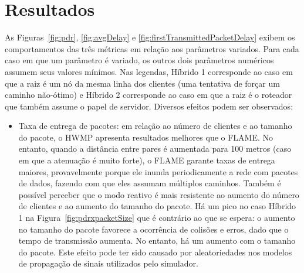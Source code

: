 \documentclass[letterpaper, 10 pt, conference]{ieeeconf}  %
\begin{document}
\section{Resultados}
\label{sec:results}

As Figuras~\ref{fig:pdr}, \ref{fig:avgDelay} e \ref{fig:firstTransmittedPacketDelay} exibem os comportamentos das três métricas em relação aos parâmetros variados. Para cada caso em que um parâmetro é variado, os outros dois parâmetros numéricos assumem seus valores mínimos. Nas legendas, Híbrido 1 corresponde ao caso em que a raiz é um nó da mesma linha dos clientes (uma tentativa de forçar um caminho não-ótimo) e Híbrido 2 corresponde ao caso em que a raiz é o roteador que também assume o papel de servidor. Diversos efeitos podem ser observados:

\begin{itemize}
	\item Taxa de entrega de pacotes: em relação ao número de clientes e ao tamanho do pacote, o HWMP apresenta resultados melhores que o FLAME. No entanto, quando a distância entre pares é aumentada para 100 metros (caso em que a atenuação é muito forte), o FLAME garante taxas de entrega maiores, provavelmente porque ele inunda periodicamente a rede com pacotes de dados, fazendo com que eles assumam múltiplos caminhos. Também é possível perceber que o modo reativo é mais resistente ao aumento do número de clientes e ao aumento do tamanho do pacote. Há um pico no caso Híbrido 1 na Figura~\ref{fig:pdrxpacketSize} que é contrário ao que se espera: o aumento no tamanho do pacote favorece a ocorrência de colisões e erros, dado que o tempo de transmissão aumenta. No entanto, há um aumento com o tamanho do pacote. Este efeito pode ter sido causado por aleatoriedades nos modelos de propagação de sinais utilizados pelo simulador.
\\

\end{itemize}
\end{document}
